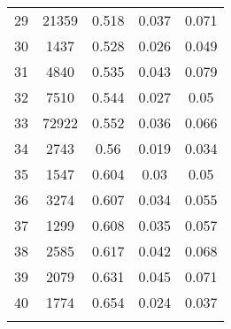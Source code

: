 \begin{tabular}{@{\extracolsep{2pt}} ccccc}
29 & 21359 & 0.518 & 0.037 & 0.071 \\ 
30 & 1437 & 0.528 & 0.026 & 0.049 \\ 
31 & 4840 & 0.535 & 0.043 & 0.079 \\ 
32 & 7510 & 0.544 & 0.027 & 0.05 \\ 
33 & 72922 & 0.552 & 0.036 & 0.066 \\ 
34 & 2743 & 0.56 & 0.019 & 0.034 \\ 
35 & 1547 & 0.604 & 0.03 & 0.05 \\ 
36 & 3274 & 0.607 & 0.034 & 0.055 \\ 
37 & 1299 & 0.608 & 0.035 & 0.057 \\ 
38 & 2585 & 0.617 & 0.042 & 0.068 \\ 
39 & 2079 & 0.631 & 0.045 & 0.071 \\ 
40 & 1774 & 0.654 & 0.024 & 0.037 \\ 
\hline \\[-1.8ex] 
\end{tabular} 
